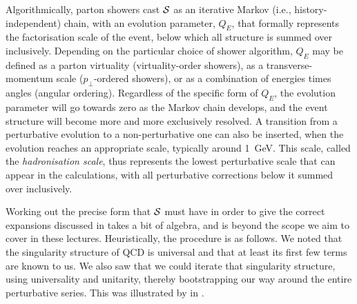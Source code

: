 Algorithmically, parton showers cast $\cal S$ as an iterative Markov
(i.e., history-independent) chain, 
with an evolution parameter, $Q_E$, that formally 
represents the factorisation scale of the event, below which all
structure is summed over inclusively. Depending on the particular
choice of shower algorithm, $Q_E$ may be defined as a parton
virtuality (virtuality-order showers), as a transverse-momentum scale
($p_\perp$-ordered showers), or as a combination of
energies times angles (angular ordering). Regardless of the specific
form of $Q_E$, 
the evolution parameter will go towards zero as the Markov chain
develops, and the event structure
will become more and more exclusively resolved. 
A transition from a
perturbative evolution to a non-perturbative one can also be
inserted, when the evolution reaches an appropriate scale, typically 
around 1~GeV. This scale, called the \emph{hadronisation scale}, thus 
represents the lowest perturbative scale that can appear in the
calculations, with all perturbative corrections below it
summed over inclusively.

Working out the precise form that $\cal S$ must have in order to give the
correct expansions discussed in  takes a
bit of algebra, and is beyond the scope we aim to cover in these
lectures. Heuristically, the procedure is as follows. 
We noted that the singularity structure of QCD is universal
and that at least its first few terms are known to us. We also saw
that we could iterate 
that singularity structure, using universality and unitarity, 
thereby bootstrapping our way around the entire perturbative
series. This was illustrated by 
 in . 

